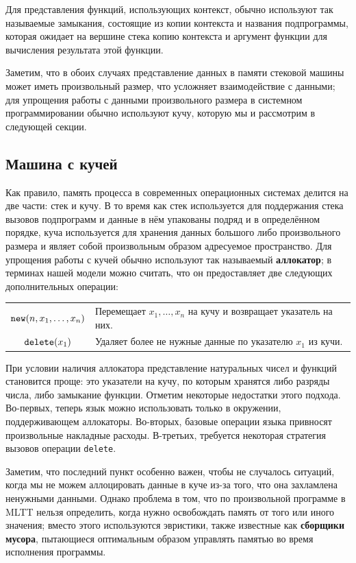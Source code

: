 \documentclass[12pt]{article}
\begin{document}
Для представления функций, использующих контекст, обычно используют так
называемые замыкания, состоящие из копии контекста и названия подпрограммы,
которая ожидает на вершине стека копию контекста и аргумент функции для
вычисления результата этой функции.

Заметим, что в обоих случаях представление данных в памяти стековой машины может
иметь произвольный размер, что усложняет взаимодействие с данными; для упрощения
работы с данными произвольного размера в системном программировании обычно
используют кучу, которую мы и рассмотрим в следующей секции.

\subsection{Машина с кучей}

Как правило, память процесса в современных операционных системах делится на две
части: стек и кучу. В то время как стек используется для поддержания стека
вызовов подпрограмм и данные в нём упакованы подряд и в определённом порядке,
куча используется для хранения данных большого либо произвольного размера и
являет собой произвольным образом адресуемое пространство. Для упрощения работы
с кучей обычно используют так называемый \textbf{аллокатор}; в терминах нашей
модели можно считать, что он предоставляет две следующих дополнительных
операции:

\begin{center}
\begin{tabular}{|c|l}
  $\verb|new|(n,x_1,\ldots,x_n)$ & Перемещает $x_1,\ldots,x_n$ на кучу и
                                   возвращает указатель на них. \\
  $\verb|delete|(x_1)$           & Удаляет более не нужные данные по указателю
                                   $x_1$ из кучи.
\end{tabular}
\end{center}

При условии наличия аллокатора представление натуральных чисел и функций
становится проще: это указатели на кучу, по которым хранятся либо разряды числа,
либо замыкание функции. Отметим некоторые недостатки этого подхода. Во-первых,
теперь язык можно использовать только в окружении, поддерживающем аллокаторы.
Во-вторых, базовые операции языка привносят произвольные накладные расходы.
В-третьих, требуется некоторая стратегия вызовов операции \texttt{delete}.

Заметим, что последний пункт особенно важен, чтобы не случалось ситуаций, когда
мы не можем аллоцировать данные в куче из-за того, что она захламлена ненужными
данными. Однако проблема в том, что по произвольной программе в MLTT нельзя
определить, когда нужно освобождать память от того или иного значения; вместо
этого используются эвристики, также известные как \textbf{сборщики мусора},
пытающиеся оптимальным образом управлять памятью во время исполнения программы.
\end{document}
